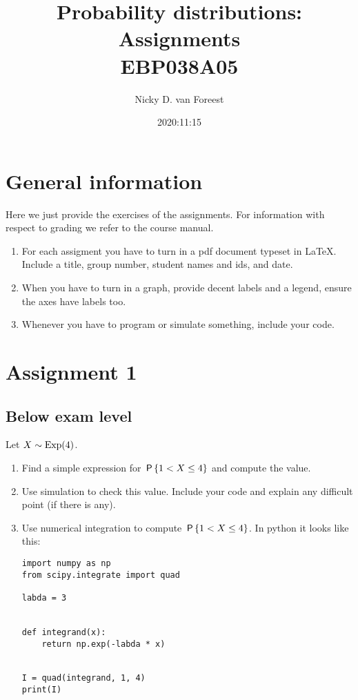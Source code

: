 \documentclass[a4paper]{article}
\author{Nicky D. van Foreest}
\date{2020:11:15}
\title{Probability distributions: Assignments\\\medskip
\large EBP038A05}
\begin{document}
\maketitle


\section*{General information}
\label{sec:orgb865fed}

Here we just provide the exercises of the assignments.  For information with respect to grading we refer to the  course manual.

\begin{enumerate}
\item For each assigment you have to turn in a pdf document typeset in \LaTeX{}. Include a title, group number, student names and ids, and date.
\item When you have to turn in a graph, provide decent labels and a legend, ensure the axes have labels too.
\item Whenever you have to program or simulate something, include your code. 
\end{enumerate}

\section{Assignment 1}
\label{sec:org9cbca82}

\subsection{Below exam level}
\label{sec:below-exam-level}


\begin{exercise}
Let $X\sim\Exp{4}$. 
\begin{enumerate}
\item Find a simple expression for $\P{1 < X  \leq 4}$ and compute the value.  
\item Use simulation to check this value. Include your code and explain any difficult point (if there is any). 
\item Use numerical integration to compute $\P{1<X\leq 4}$.  In python it looks like this:
\begin{verbatim}
import numpy as np
from scipy.integrate import quad

labda = 3


def integrand(x):
    return np.exp(-labda * x)


I = quad(integrand, 1, 4)
print(I)
\end{verbatim}
  
\end{enumerate}
\end{exercise}
\end{document}
